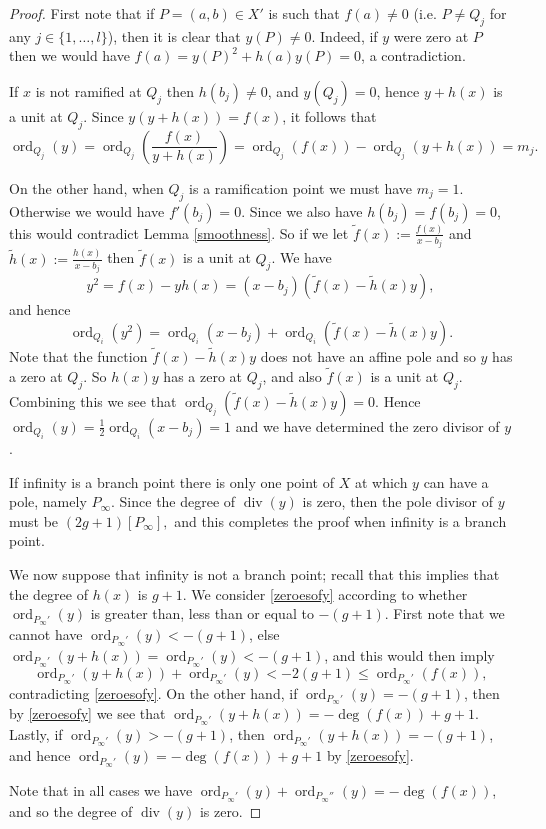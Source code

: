 \documentclass[11pt]{article} %
\theoremstyle{plain}
\theoremstyle{remark}
\DeclareMathOperator{\ord}{ord}
\DeclareMathOperator{\di}{div}
\begin{document}
\begin{proof}
 First note that if $P = (a,b) \in X'$ is such that $f(a) \neq 0$ (i.e. $P\neq Q_j$ for any $j\in \{ 1,\ldots, l\}$), then it is clear that $y(P) \neq 0$.
 Indeed, if $y$ were zero at $P$ then we would have $f(a) = y(P)^2 + h(a)y(P) = 0$, a contradiction.
 
 If $x$ is not ramified at $Q_j$ then $h(b_j) \neq 0$, and $y(Q_j) = 0$, hence $y+h(x)$ is a unit at $Q_j$.
 Since $y(y+h(x)) = f(x)$, it follows that
 \begin{equation}\label{zeroesofy}
  \ord_{Q_j}(y) = \ord_{Q_j}\left(\frac{f(x)}{y+h(x)}\right) = \ord_{Q_j}(f(x)) -\ord_{Q_j}(y+h(x)) = m_j.
 \end{equation}

 On the other hand, when $Q_j$ is a ramification point we must have $m_j=1$.
 Otherwise we would have $f'(b_j) = 0$.
Since we also have $h(b_j) = f(b_j) = 0$, this would contradict Lemma \ref{smoothness}.
 So if we let $\tilde f(x) := \frac{f(x)}{x-b_j}$ and $\tilde h(x) := \frac{h(x)}{x-b_j}$ then $\tilde f(x)$ is a unit at $Q_j$.
We have \[y^2 = f(x) - yh(x) = (x-b_j)(\tilde f(x) - \tilde h(x)y),\]
 and hence
 \begin{equation*}
   \ord_{Q_i}(y^2) = \ord_{Q_i}(x-b_j) + \ord_{Q_i}(\tilde f(x) - \tilde h(x)y).
  \end{equation*}
Note that the function $\tilde f(x) - \tilde h(x)y$ does not have an affine pole and so $y$ has a zero at $Q_j$. So $h(x)y$ has a zero at $Q_j$, and also $\tilde f(x)$ is a unit at $Q_j$. Combining this we see that $\ord_{Q_j}(\tilde f(x)-\tilde h(x)y) = 0$.
Hence $\ord_{Q_i}(y) = \frac{1}{2}\ord_{Q_i}(x-b_j) = 1$ and we have determined the zero divisor of $y$. 


If infinity is a branch point there is only one point of $X$ at which $y$ can have a pole, namely $P_\infty$.
Since the degree of $\di (y)$ is zero, then the pole divisor of $y$ must be
$
 (2g+1)[P_\infty],
$
and this completes the proof when infinity is a branch point.

We now suppose that infinity is not a branch point; recall that this implies that the degree of $h(x)$ is $g+1$.
We consider \eqref{zeroesofy} according to whether $\ord_{P_\infty'}(y)$ is greater than, less than or equal to $-(g+1)$.
First note that we cannot have $\ord_{P_\infty'}(y) < -(g+1)$, else $\ord_{P_\infty'}(y+h(x)) = \ord_{P_\infty'}(y)< -(g+1)$, and this would then imply \[ \ord_{P_\infty'}(y+h(x)) + \ord_{P_\infty'}(y) < -2(g+1) \leq \ord_{P_\infty'}(f(x)), \] contradicting \eqref{zeroesofy}.
On the other hand, if $\ord_{P_\infty'} (y) = -(g+1)$, then by \eqref{zeroesofy} we see that $\ord_{P_\infty'}(y+h(x)) = -\deg(f(x)) +g+1$.
Lastly, if $\ord_{P_\infty'}(y) > -(g+1)$, then $\ord_{P_\infty'}(y+h(x)) = -(g+1)$, and hence $\ord_{P_\infty'} (y) = -\deg(f(x)) +g+1$ by \eqref{zeroesofy}.

Note that in all cases we have $\ord_{P_\infty'}(y) + \ord_{P_\infty''}(y) = -\deg(f(x))$, and so the degree of $\di (y)$ is zero.
\end{proof}
\end{document}
